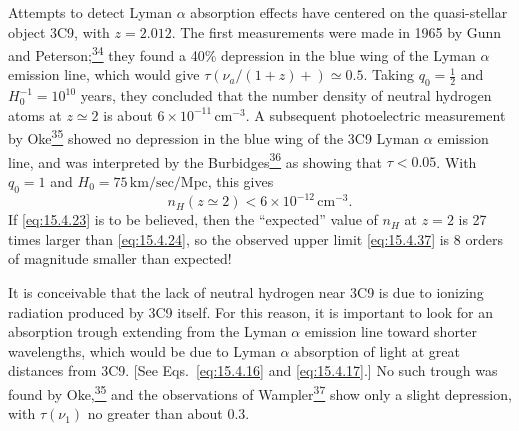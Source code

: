 Attempts to detect Lyman \(\alpha\) absorption effects have centered on the
quasi-stellar object 3C9, with \(z=2.012\). The first measurements were made
in 1965 by Gunn and Peterson;\hyperref[ch15-ref-34]{\textsuperscript{34}}
they found a 40\% depression in the blue wing of the Lyman \(\alpha\) emission
line, which would give
\(\tau(\nu_a/(1+z)+)\simeq0.5\). Taking \(q_0=\tfrac12\) and
\(H_0^{-1}=10^{10}\) years, they concluded that the number density of neutral
hydrogen atoms at \(z\simeq2\) is about \(6\times10^{-11}\,\mathrm{cm^{-3}}\).
A subsequent photoelectric measurement by
Oke\hyperref[ch15-ref-35]{\textsuperscript{35}} showed no depression in the
blue wing of the 3C9 Lyman \(\alpha\) emission line, and was interpreted by
the Burbidges\hyperref[ch15-ref-36]{\textsuperscript{36}} as showing that
\(\tau<0.05\). With \(q_0=1\) and \(H_0=75\,\mathrm{km/sec/Mpc}\), this gives
\begin{equation}
  n_H(z\simeq2)<6\times10^{-12}\,\mathrm{cm^{-3}}.
  \tag{15.4.37}\label{eq:15.4.37}
\end{equation}
If \eqref{eq:15.4.23} is to be believed, then the ``expected'' value of
\(n_H\) at \(z=2\) is 27 times larger than \eqref{eq:15.4.24}, so the
observed upper limit \eqref{eq:15.4.37} is 8 orders of magnitude smaller than
expected!

It is conceivable that the lack of neutral hydrogen near 3C9 is due to
ionizing radiation produced by 3C9 itself. For this reason, it is important to
look for an absorption trough extending from the Lyman \(\alpha\) emission line
toward shorter wavelengths, which would be due to Lyman \(\alpha\) absorption
of light at great distances from 3C9. [See Eqs.~\eqref{eq:15.4.16} and
\eqref{eq:15.4.17}.] No such trough was found by
Oke,\hyperref[ch15-ref-35]{\textsuperscript{35}} and the observations of
Wampler\hyperref[ch15-ref-37]{\textsuperscript{37}} show only a slight
depression, with \(\tau(\nu_1)\) no greater than about 0.3.

